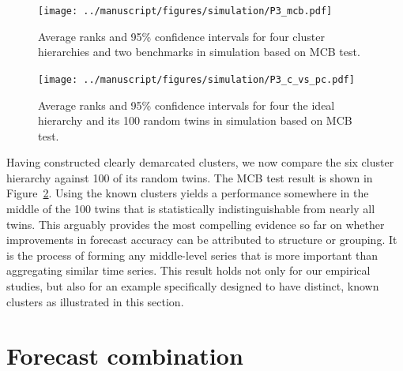 \documentclass[a4paper,review,12pt,authoryear]{elsarticle}
\begin{document}
\begin{figure}[h!]
    \centering
    \vspace{0.1in}\texttt{[image: ../manuscript/figures/simulation/P3\_mcb.pdf]}
   \vspace{-0.1in}
\caption{\label{fig:simu_P3_benchmarks}Average ranks and 95\% confidence intervals for four cluster hierarchies and two benchmarks in simulation based on MCB test.}
\end{figure}

\begin{figure}[h!]
    \centering
\texttt{[image: ../manuscript/figures/simulation/P3\_c\_vs\_pc.pdf]}
    \vspace{-0.1in}
    \caption{Average ranks and 95\% confidence intervals for four the ideal hierarchy and its 100 random twins in simulation based on MCB test.}
    \label{fig:simu_P3_c_vs_pc}
\end{figure}


Having constructed clearly demarcated clusters, we now compare the six cluster hierarchy against 100 of its random twins.  The MCB test result is shown in Figure~\ref{fig:simu_P3_c_vs_pc}. Using the known clusters yields a performance somewhere in the middle of the 100 twins that is statistically indistinguishable from nearly all twins. %
This arguably provides the most compelling evidence so far on whether improvements in forecast accuracy can be attributed to structure or grouping. It is the process of forming any middle-level series that is more important than aggregating similar time series. This result holds not only for our empirical studies, but also for an example specifically designed to have distinct, known clusters as illustrated in this section.






\section{Forecast combination}
\label{sec:combination}
\end{document}
